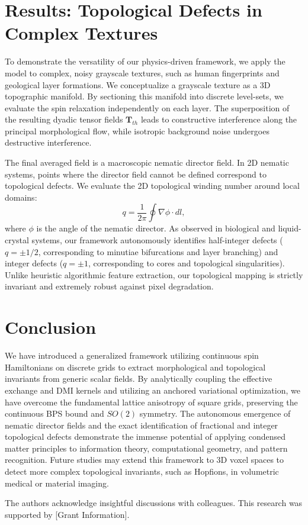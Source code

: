 \documentclass[reprint,amsmath,amssymb,aps,prapplied,longbibliography]{revtex4-2}
\begin{document}
\section{Results: Topological Defects in Complex Textures}

To demonstrate the versatility of our physics-driven framework, we apply the model to complex, noisy grayscale textures, such as human fingerprints and geological layer formations. We conceptualize a grayscale texture as a 3D topographic manifold. By sectioning this manifold into discrete level-sets, we evaluate the spin relaxation independently on each layer. The superposition of the resulting dyadic tensor fields $\mathbf{T}_{th}$ leads to constructive interference along the principal morphological flow, while isotropic background noise undergoes destructive interference.

The final averaged field is a macroscopic nematic director field. In 2D nematic systems, points where the director field cannot be defined correspond to topological defects. We evaluate the 2D topological winding number around local domains:
\begin{equation}
q = \frac{1}{2\pi} \oint \nabla \phi \cdot dl,
\end{equation}
where $\phi$ is the angle of the nematic director. As observed in biological and liquid-crystal systems, our framework autonomously identifies half-integer defects ($q = \pm 1/2$, corresponding to minutiae bifurcations and layer branching) and integer defects ($q = \pm 1$, corresponding to cores and topological singularities). Unlike heuristic algorithmic feature extraction, our topological mapping is strictly invariant and extremely robust against pixel degradation. 

\section{Conclusion}
We have introduced a generalized framework utilizing continuous spin Hamiltonians on discrete grids to extract morphological and topological invariants from generic scalar fields. By analytically coupling the effective exchange and DMI kernels and utilizing an anchored variational optimization, we have overcome the fundamental lattice anisotropy of square grids, preserving the continuous BPS bound and $SO(2)$ symmetry. The autonomous emergence of nematic director fields and the exact identification of fractional and integer topological defects demonstrate the immense potential of applying condensed matter principles to information theory, computational geometry, and pattern recognition. Future studies may extend this framework to 3D voxel spaces to detect more complex topological invariants, such as Hopfions, in volumetric medical or material imaging.

\begin{acknowledgments}
The authors acknowledge insightful discussions with colleagues. This research was supported by [Grant Information].
\end{acknowledgments}
\end{document}
